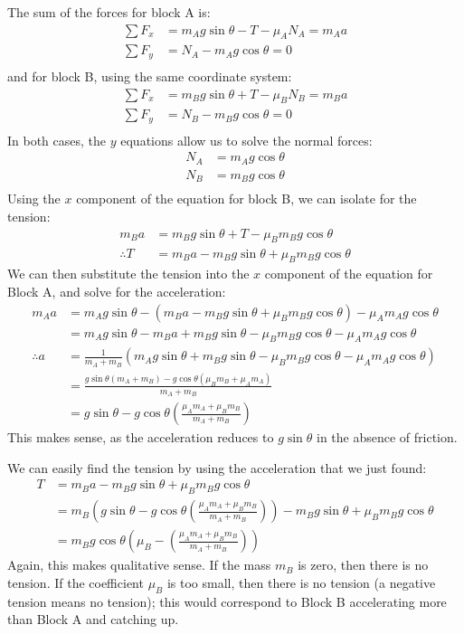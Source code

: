 \begin{solution}
The sum of the forces for block A is:
\begin{align*}
\sum F_x &= m_Ag\sin\theta-T-\mu_A N_A = m_Aa \\
\sum F_y &= N_A-m_Ag\cos\theta = 0 \\
\end{align*}
and for block B, using the same coordinate system:
\begin{align*}
\sum F_x &= m_Bg\sin\theta+T-\mu_B N_B = m_Ba \\
\sum F_y &= N_B-m_Bg\cos\theta = 0 \\
\end{align*}
In both cases, the $y$ equations allow us to solve the normal forces:
\begin{align*}
N_A&=m_Ag\cos\theta\\
N_B&=m_Bg\cos\theta\\
\end{align*}
Using the $x$ component of the equation for block B, we can isolate for the tension:
\begin{align*}
m_Ba&=m_Bg\sin\theta+T-\mu_B m_Bg\cos\theta \\
\therefore T&=m_Ba-m_Bg\sin\theta+\mu_B m_Bg\cos\theta
\end{align*}
We can then substitute the tension into the $x$ component of the equation for Block A, and solve for the acceleration:
\begin{align*}
m_Aa &= m_Ag\sin\theta-(m_Ba-m_Bg\sin\theta+\mu_B m_Bg\cos\theta)-\mu_A m_Ag\cos\theta \\
&=m_Ag\sin\theta-m_Ba+m_Bg\sin\theta-\mu_B m_Bg\cos\theta-\mu_A m_Ag\cos\theta \\
\therefore a &= \frac{1}{m_A+m_B}(m_Ag\sin\theta+m_Bg\sin\theta-\mu_B m_Bg\cos\theta-\mu_A m_Ag\cos\theta)\\
&=\frac{g\sin\theta(m_A+m_B)-g\cos\theta(\mu_B m_B+\mu_A m_A)}{m_A+m_B}\\
&=g\sin\theta-g\cos\theta\left( \frac{\mu_A m_A+\mu_B m_B}{m_A+m_B} \right)
\end{align*}
This makes sense, as the acceleration reduces to $g\sin\theta$ in the absence of friction.

We can easily find the tension by using the acceleration that we just found:
\begin{align*}
 T&=m_Ba-m_Bg\sin\theta+\mu_B m_Bg\cos\theta\\
 &=m_B\left( g\sin\theta-g\cos\theta\left( \frac{\mu_A m_A+\mu_B m_B}{m_A+m_B} \right) \right)-m_Bg\sin\theta+\mu_B m_Bg\cos\theta\\
 &=m_Bg\cos\theta\left(  \mu_B  - \left( \frac{\mu_A m_A+\mu_B m_B}{m_A+m_B} \right) \right)
\end{align*}
Again, this makes qualitative sense. If the mass $m_B$ is zero, then there is no tension. If the coefficient $\mu_B$ is too small, then there is no tension (a negative tension means no tension); this would correspond to Block B accelerating more than Block A and catching up.
\end{solution}

